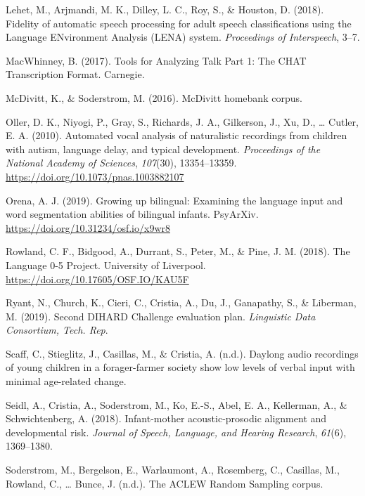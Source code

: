 \documentclass[english,table,man,floatsintext]{apa6}
\begin{document}
\leavevmode\hypertarget{ref-Lehet2018}{}%
Lehet, M., Arjmandi, M. K., Dilley, L. C., Roy, S., \& Houston, D. (2018). Fidelity of automatic speech processing for adult speech classifications using the Language ENvironment Analysis (LENA) system. \emph{Proceedings of Interspeech}, 3--7.

\leavevmode\hypertarget{ref-macwhinney2017tools}{}%
MacWhinney, B. (2017). Tools for Analyzing Talk Part 1: The CHAT Transcription Format. Carnegie.

\leavevmode\hypertarget{ref-mcdivitt2016mcdivitt}{}%
McDivitt, K., \& Soderstrom, M. (2016). McDivitt homebank corpus.

\leavevmode\hypertarget{ref-Oller}{}%
Oller, D. K., Niyogi, P., Gray, S., Richards, J. A., Gilkerson, J., Xu, D., \ldots{} Cutler, E. A. (2010). Automated vocal analysis of naturalistic recordings from children with autism, language delay, and typical development. \emph{Proceedings of the National Academy of Sciences}, \emph{107}(30), 13354--13359. \url{https://doi.org/10.1073/pnas.1003882107}

\leavevmode\hypertarget{ref-orena_2019}{}%
Orena, A. J. (2019). Growing up bilingual: Examining the language input and word segmentation abilities of bilingual infants. PsyArXiv. \url{https://doi.org/10.31234/osf.io/x9wr8}

\leavevmode\hypertarget{ref-rowland2018}{}%
Rowland, C. F., Bidgood, A., Durrant, S., Peter, M., \& Pine, J. M. (2018). The Language 0-5 Project. University of Liverpool. \url{https://doi.org/10.17605/OSF.IO/KAU5F}

\leavevmode\hypertarget{ref-ryant2019second}{}%
Ryant, N., Church, K., Cieri, C., Cristia, A., Du, J., Ganapathy, S., \& Liberman, M. (2019). Second DIHARD Challenge evaluation plan. \emph{Linguistic Data Consortium, Tech. Rep}.

\leavevmode\hypertarget{ref-scaff}{}%
Scaff, C., Stieglitz, J., Casillas, M., \& Cristia, A. (n.d.). Daylong audio recordings of young children in a forager-farmer society show low levels of verbal input with minimal age-related change.

\leavevmode\hypertarget{ref-Seidl2018}{}%
Seidl, A., Cristia, A., Soderstrom, M., Ko, E.-S., Abel, E. A., Kellerman, A., \& Schwichtenberg, A. (2018). Infant-mother acoustic-prosodic alignment and developmental risk. \emph{Journal of Speech, Language, and Hearing Research}, \emph{61}(6), 1369--1380.

\leavevmode\hypertarget{ref-soderstrom}{}%
Soderstrom, M., Bergelson, E., Warlaumont, A., Rosemberg, C., Casillas, M., Rowland, C., \ldots{} Bunce, J. (n.d.). The ACLEW Random Sampling corpus.
\end{document}
